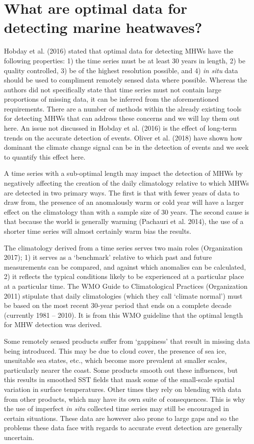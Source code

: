 \documentclass[]{article}
\begin{document}
\section{What are optimal data for detecting marine
heatwaves?}\label{what-are-optimal-data-for-detecting-marine-heatwaves}

Hobday et al. (2016) stated that optimal data for detecting MHWs have
the following properties: 1) the time series must be at least 30 years
in length, 2) be quality controlled, 3) be of the highest resolution
possible, and 4) \emph{in situ} data should be used to compliment
remotely sensed data where possible. Whereas the authors did not
specifically state that time series must not contain large proportions
of missing data, it can be inferred from the aforementioned
requirements. There are a number of methods within the already existing
tools for detecting MHWs that can address these concerns and we will lay
them out here. An issue not discussed in Hobday et al. (2016) is the
effect of long-term trends on the accurate detection of events. Oliver
et al. (2018) have shown how dominant the climate change signal can be
in the detection of events and we seek to quantify this effect here.

A time series with a sub-optimal length may impact the detection of MHWs
by negatively affecting the creation of the daily climatology relative
to which MHWs are detected in two primary ways. The first is that with
fewer years of data to draw from, the presence of an anomalously warm or
cold year will have a larger effect on the climatology than with a
sample size of 30 years. The second cause is that because the world is
generally warming (Pachauri et al. 2014), the use of a shorter time
series will almost certainly warm bias the results.

The climatology derived from a time series serves two main roles
(Organization 2017); 1) it serves as a `benchmark' relative to which
past and future measurements can be compared, and against which
anomalies can be calculated, 2) it reflects the typical conditions
likely to be experienced at a particular place at a particular time. The
WMO Guide to Climatological Practices (Organization 2011) stipulate that
daily climatologies (which they call `climate normal') must be based on
the most recent 30-year period that ends on a complete decade (currently
1981 -- 2010). It is from this WMO guideline that the optimal length for
MHW detection was derived.

Some remotely sensed products suffer from `gappiness' that result in
missing data being introduced. This may be due to cloud cover, the
presence of sea ice, unsuitable sea states, etc., which become more
prevalent at smaller scales, particularly nearer the coast. Some
products smooth out these influences, but this results in smoothed SST
fields that mask some of the small-scale spatial variation in surface
temperatures. Other times they rely on blending with data from other
products, which may have its own suite of consequences. This is why the
use of imperfect \emph{in situ} collected time series may still be
encouraged in certain situations. These data are however also prone to
large gaps and so the problems these data face with regards to accurate
event detection are generally uncertain.
\end{document}
